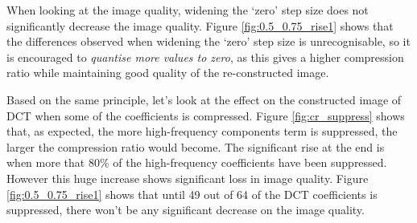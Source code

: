 \documentclass[a4paper, 11pt]{article}
\begin{document}
When looking at the image quality, widening the `zero' step size does not significantly decrease the image quality. Figure \ref{fig:0.5_0.75_rise1} shows that the differences observed when widening the `zero' step size is unrecognisable, so it is encouraged to \textit{quantise more values to zero}, as this gives a higher compression ratio while maintaining good quality of the re-constructed image. 

Based on the same principle, let's look at the effect on the constructed image of DCT when some of the coefficients is compressed. Figure \ref{fig:cr_suppress} shows that, as expected, the more high-frequency components term is suppressed, the larger the compression ratio would become. The significant rise at the end is when more that $80\%$ of the high-frequency coefficients have been suppressed. However this huge increase shows significant loss in image quality. Figure \ref{fig:0.5_0.75_rise1} shows that until 49 out of 64 of the DCT coefficients is suppressed, there won't be any significant decrease on the image quality. 

\newpage
\end{document}
